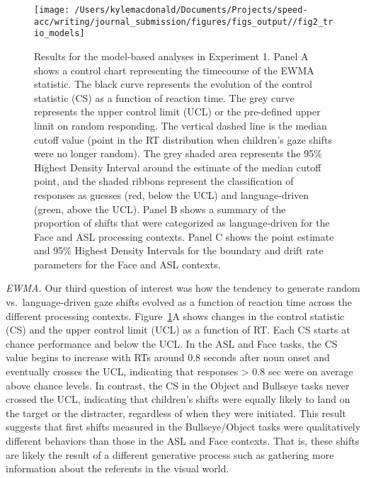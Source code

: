 \documentclass[,man,floatsintext]{apa6}
\begin{document}
\begin{figure}[!t]

{\centering \texttt{[image: /Users/kylemacdonald/Documents/Projects/speed-acc/writing/journal\_submission/figures/figs\_output//fig2\_trio\_models]} 

}

\caption{Results for the model-based analyses in Experiment 1. Panel A shows a control chart representing the timecourse of the EWMA statistic. The black curve represents the evolution of the control statistic (CS) as a function of reaction time. The grey curve represents the upper control limit (UCL) or the pre-defined upper limit on random responding. The vertical dashed line is the median cutoff value (point in the RT distribution when children's gaze shifts were no longer random). The grey shaded area represents the 95\% Highest Density Interval around the estimate of the median cutoff point, and the shaded ribbons represent the classification of responses as guesses (red, below the UCL) and language-driven (green, above the UCL). Panel B shows a summary of the proportion of shifts that were categorized as language-driven for the Face and ASL processing contexts. Panel C shows the point estimate and 95\% Highest Density Intervals for the boundary and drift rate parameters for the Face and ASL contexts.}\label{fig:trio-model-plot}
\end{figure}

\emph{EWMA.} Our third question of interest was how the tendency to generate random vs.~language-driven gaze shifts evolved as a function of reaction time across the different processing contexts. Figure~\ref{fig:trio-model-plot}A shows changes in the control statistic (CS) and the upper control limit (UCL) as a function of RT. Each CS starts at chance performance and below the UCL. In the ASL and Face tasks, the CS value begins to increase with RTs around 0.8 seconds after noun onset and eventually crosses the UCL, indicating that responses \textgreater{} 0.8 sec were on average above chance levels. In contrast, the CS in the Object and Bullseye tasks never crossed the UCL, indicating that children's shifts were equally likely to land on the target or the distracter, regardless of when they were initiated. This result suggests that first shifts measured in the Bullseye/Object tasks were qualitatively different behaviors than those in the ASL and Face contexts. That is, these shifts are likely the result of a different generative process such as gathering more information about the referents in the visual world.
\end{document}
